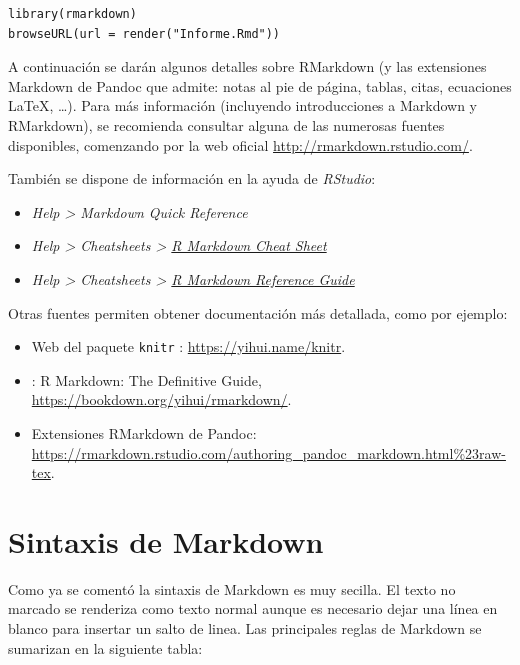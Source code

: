 \documentclass[]{book}
\theoremstyle{definition}
\theoremstyle{definition}
\theoremstyle{definition}
\theoremstyle{remark}
\begin{document}
\begin{verbatim}
library(rmarkdown)
browseURL(url = render("Informe.Rmd"))
\end{verbatim}

A continuación se darán algunos detalles sobre RMarkdown (y las
extensiones Markdown de Pandoc que admite: notas al pie de página,
tablas, citas, ecuaciones LaTeX, \ldots{}). Para más información
(incluyendo introducciones a Markdown y RMarkdown), se recomienda
consultar alguna de las numerosas fuentes disponibles, comenzando por la
web oficial \url{http://rmarkdown.rstudio.com/}.

También se dispone de información en la ayuda de \emph{RStudio}:

\begin{itemize}
\item
  \emph{Help \textgreater{} Markdown Quick Reference}
\item
  \emph{Help \textgreater{} Cheatsheets \textgreater{}
  \href{https://www.rstudio.org/links/r_markdown_cheat_sheet}{R Markdown
  Cheat Sheet}}
\item
  \emph{Help \textgreater{} Cheatsheets \textgreater{}
  \href{https://www.rstudio.com/wp-content/uploads/2015/03/rmarkdown-reference.pdf}{R
  Markdown Reference Guide}}
\end{itemize}

Otras fuentes permiten obtener documentación más detallada, como por
ejemplo:

\begin{itemize}
\item
  Web del paquete \texttt{knitr} \citep{R-knitr}:
  \url{https://yihui.name/knitr}.
\item
  \citet{xie2018r} : R Markdown: The Definitive Guide,
  \url{https://bookdown.org/yihui/rmarkdown/}.
\item
  Extensiones RMarkdown de Pandoc:
  \url{https://rmarkdown.rstudio.com/authoring_pandoc_markdown.html\%23raw-tex}.
\end{itemize}

\section{Sintaxis de Markdown}\label{markdown}

Como ya se comentó la sintaxis de Markdown es muy secilla. El texto no
marcado se renderiza como texto normal aunque es necesario dejar una
línea en blanco para insertar un salto de linea. Las principales reglas
de Markdown se sumarizan en la siguiente tabla:
\end{document}
